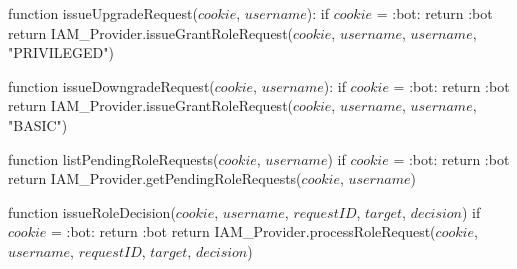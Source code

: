 function issueUpgradeRequest($cookie$, $username$):
    if $cookie$ = :bot:
        return :bot
    return IAM_Provider.issueGrantRoleRequest($cookie$, $username$, $username$, "PRIVILEGED") 
    
function issueDowngradeRequest($cookie$, $username$):
    if $cookie$ = :bot:
        return :bot
    return IAM_Provider.issueGrantRoleRequest($cookie$, $username$, $username$, "BASIC") 
    
function listPendingRoleRequests($cookie$, $username$) 
    if $cookie$ = :bot:
        return :bot
    return IAM_Provider.getPendingRoleRequests($cookie$, $username$)
    
function issueRoleDecision($cookie$, $username$, $requestID$, $target$, $decision$) 
    if $cookie$ = :bot:
        return :bot
    return IAM_Provider.processRoleRequest($cookie$, $username$, $requestID$, $target$, $decision$)